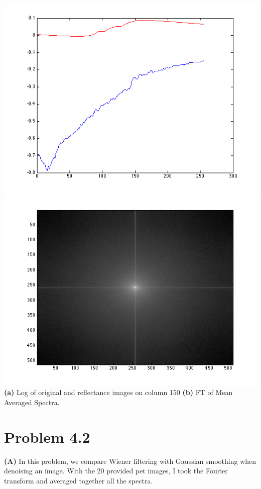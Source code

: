 \documentclass[12pt,twoside]{article}
\newcommand{\tabUnit}{3ex}
\newcommand{\tabT}{\hspace*{\tabUnit}}
\begin{document}
    \includegraphics[scale=.4]{col150} \includegraphics[scale=.4]{MS} 
\tabT \textbf{(a)} Log of original and reflectance images on column 150 \textbf{(b)} FT of Mean Averaged Spectra.
\newline


\section*{Problem 4.2}
\tabT \textbf{(A)} In this problem, we compare Wiener filtering with Gaussian smoothing when denoising an image.  With the 20 provided pet images, I took the Fourier transform and averaged together all the spectra.
\newline 
\end{document}
